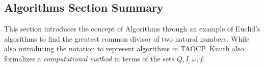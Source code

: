 \documentclass[\main/main.tex]{subfiles}
\begin{document}
  \subsection{Algorithms Section Summary}
  This section introduces the concept of Algorithms through an example of Euclid's
  algorithms to find the greatest common divisor of two natural numbers. While also
  introducing the notation to represent algorithms in TAOCP. Knuth also formalizes
  a \textit{computational method} in terms of the sets $Q,I,\omega, f$.


  
\end{document}
